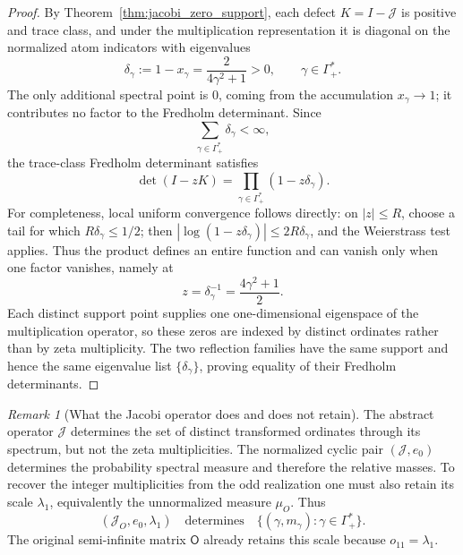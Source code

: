 \documentclass[preprint,12pt]{elsarticle}
\numberwithin{equation}{section}
\theoremstyle{plain}
\theoremstyle{definition}
\theoremstyle{remark}
\newtheorem{remark}[theorem]{Remark}
\newcommand{\Omat}{\mathsf O}
\begin{document}
\begin{proof}
By Theorem~\ref{thm:jacobi_zero_support}, each defect $K=I-\mathcal J$ is positive and trace class, and under the multiplication representation it is diagonal on the normalized atom indicators with eigenvalues
\begin{equation}
\delta_\gamma:=1-x_\gamma=\frac{2}{4\gamma^2+1}>0,
\qquad \gamma\in\Gamma_+^*.
\end{equation}
The only additional spectral point is $0$, coming from the accumulation $x_\gamma\to1$; it contributes no factor to the Fredholm determinant.  Since
\begin{equation}
\sum_{\gamma\in\Gamma_+^*}\delta_\gamma<\infty,
\end{equation}
the trace-class Fredholm determinant satisfies
\begin{equation}
\det(I-zK)=\prod_{\gamma\in\Gamma_+^*}(1-z\delta_\gamma).
\end{equation}
For completeness, local uniform convergence follows directly: on $|z|\le R$, choose a tail for which $R\delta_\gamma\le1/2$; then
$|\log(1-z\delta_\gamma)|\le2R\delta_\gamma$, and the Weierstrass test applies.  Thus the product defines an entire function and can vanish only when one factor vanishes, namely at
\begin{equation}
z=\delta_\gamma^{-1}=\frac{4\gamma^2+1}{2}.
\end{equation}
Each distinct support point supplies one one-dimensional eigenspace of the multiplication operator, so these zeros are indexed by distinct ordinates rather than by zeta multiplicity.  The two reflection families have the same support and hence the same eigenvalue list $\{\delta_\gamma\}$, proving equality of their Fredholm determinants.
\end{proof}

\begin{remark}[What the Jacobi operator does and does not retain]
\label{rem:operator_support_vs_multiplicity}
The abstract operator $\mathcal J$ determines the set of distinct transformed ordinates through its spectrum, but not the zeta multiplicities.  The normalized cyclic pair $(\mathcal J,e_0)$ determines the probability spectral measure and therefore the relative masses.  To recover the integer multiplicities from the odd realization one must also retain its scale $\lambda_1$, equivalently the unnormalized measure $\mu_O$.  Thus
\begin{equation}
(\mathcal J_O,e_0,\lambda_1)
\quad\text{determines}\quad
\{(\gamma,m_\gamma):\gamma\in\Gamma_+^*\}.
\label{eq:operator_cyclic_scale_data}
\end{equation}
The original semi-infinite matrix $\Omat$ already retains this scale because $o_{11}=\lambda_1$.
\end{remark}
\end{document}

